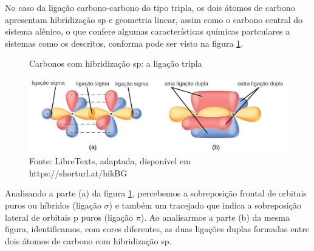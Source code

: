 No caso da ligação carbono-carbono do tipo tripla, os dois átomos de carbono apresentam hibridização sp e geometria linear, assim como o carbono central do sistema alênico, o que confere algumas características químicas partculares a sistemas como os descritos, conforma pode ser visto na figura \ref{fig:tripla}.

\begin{figure}[h]
\centering
\caption{Carbonos com hibridização sp: a ligação tripla}
\vspace{0.25cm}
\label{fig:tripla}
\includegraphics[width=1\linewidth]{imagens/tripla.png}
\caption*{Fonte: LibreTexts, adaptada, disponível em https://shorturl.at/hikBG}
\end{figure}

Analisando a parte (a) da figura \ref{fig:tripla}, percebemos a sobreposição frontal de orbitais puros ou híbridos (ligação $\sigma$) e também um tracejado que indica a sobreposição lateral de orbitais p puros (ligação $\pi$). Ao analisarmos a parte (b) da mesma figura, identificamos, com cores diferentes, as duas ligações duplas formadas entre dois átomos de carbono com hibridização sp. 